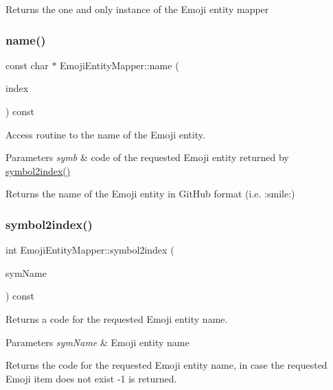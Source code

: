 Returns the one and only instance of the Emoji entity mapper \mbox{\label{class_emoji_entity_mapper_a33137ef11c5d63f6f7d7a27c01db943e}} 
\subsubsection{\texorpdfstring{name()}{name()}}
{\footnotesize\ttfamily const char $\ast$ Emoji\+Entity\+Mapper\+::name (\begin{DoxyParamCaption}\item[{int}]{index }\end{DoxyParamCaption}) const}



Access routine to the name of the Emoji entity. 


\begin{DoxyParams}{Parameters}
{\em symb} & code of the requested Emoji entity returned by \mbox{\hyperlink{class_emoji_entity_mapper_a48541059ca5ed1d155c65e4b6b69fe24}{symbol2index()}} \\
\hline
\end{DoxyParams}
\begin{DoxyReturn}{Returns}
the name of the Emoji entity in Git\+Hub format (i.\+e. \+:smile\+:) 
\end{DoxyReturn}
\mbox{\label{class_emoji_entity_mapper_a48541059ca5ed1d155c65e4b6b69fe24}} 
\subsubsection{\texorpdfstring{symbol2index()}{symbol2index()}}
{\footnotesize\ttfamily int Emoji\+Entity\+Mapper\+::symbol2index (\begin{DoxyParamCaption}\item[{const \mbox{\hyperlink{class_q_c_string}{Q\+C\+String}} \&}]{sym\+Name }\end{DoxyParamCaption}) const}



Returns a code for the requested Emoji entity name. 


\begin{DoxyParams}{Parameters}
{\em sym\+Name} & Emoji entity name \\
\hline
\end{DoxyParams}
\begin{DoxyReturn}{Returns}
the code for the requested Emoji entity name, in case the requested Emoji item does not exist {\ttfamily -\/1} is returned. 
\end{DoxyReturn}
\mbox{\label{class_emoji_entity_mapper_a1b6d7e3d1f82adf44c46fdd82d11b2f8}} 
